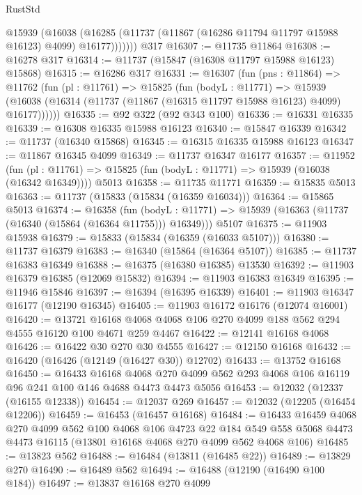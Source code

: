 \begin{lexlean}{RustStd}
\begin{coremodule}
          @15939
            (@16038
              (@16285 (@11737 (@11867 (@16286 @11794 @11797 @15988 @16123) @4099) @16177)))))))
    @317
@16307 := @11735 @11864
@16308 := @16278 @317
@16314 := @11737 (@15847 (@16308 @11797 @15988 @16123) @15868)
@16315 := @16286 @317
@16331 := @16307
    (fun (pns : @11864) =>
    @11762
      (fun (pl : @11761) =>
      @15825
        (fun (bodyL : @11771) =>
        @15939 (@16038 (@16314 (@11737 (@11867 (@16315 @11797 @15988 @16123) @4099) @16177))))))
@16335 := @92 @322 (@92 @343 @100)
@16336 := @16331 @16335
@16339 := @16308 @16335 @15988 @16123
@16340 := @15847 @16339
@16342 := @11737 (@16340 @15868)
@16345 := @16315 @16335 @15988 @16123
@16347 := @11867 @16345 @4099
@16349 := @11737 @16347 @16177
@16357 := @11952
    (fun (pl : @11761) => @15825 (fun (bodyL : @11771) => @15939 (@16038 (@16342 @16349))))
    @5013
@16358 := @11735 @11771
@16359 := @15835 @5013
@16363 := @11737 (@15833 (@15834 (@16359 @16034)))
@16364 := @15865 @5013
@16374 := @16358
    (fun (bodyL : @11771) => @15939 (@16363 (@11737 (@16340 (@15864 (@16364 @11755))) @16349)))
    @5107
@16375 := @11903 @15938
@16379 := @15833 (@15834 (@16359 (@16033 @5107)))
@16380 := @11737 @16379
@16383 := @16340 (@15864 (@16364 @5107))
@16385 := @11737 @16383 @16349
@16388 := @16375 (@16380 @16385) @13530
@16392 := @11903 @16379 @16385 (@12069 @15832)
@16394 := @11903 @16383 @16349
@16395 := @11946 @15846
@16397 := @16394 (@16395 @16339)
@16401 := @11903 @16347 @16177 (@12190 @16345)
@16405 := @11903 @16172 @16176 (@12074 @16001)
@16420 := @13721
    @16168
    @4068
    @4068
    @106
    @270
    @4099
    @188
    @562
    @294
    @4555
    @16120
    @100
    @4671
    @259
    @4467
@16422 := @12141 @16168 @4068
@16426 := @16422 @30 @270 @30 @4555
@16427 := @12150 @16168
@16432 := @16420 (@16426 (@12149 (@16427 @30)) @12702)
@16433 := @13752 @16168
@16450 := @16433
    @16168
    @4068
    @270
    @4099
    @562
    @293
    @4068
    @106
    @16119
    @96
    @241
    @100
    @146
    @4688
    @4473
    @4473
    @5056
@16453 := @12032 (@12337 (@16155 @12338))
@16454 := @12037 @269
@16457 := @12032 (@12205 (@16454 @12206))
@16459 := @16453 (@16457 @16168)
@16484 := @16433
    @16459
    @4068
    @270
    @4099
    @562
    @100
    @4068
    @106
    @4723
    @22
    @184
    @549
    @558
    @5068
    @4473
    @4473
    @16115
    (@13801 @16168 @4068 @270 @4099 @562 @4068 @106)
@16485 := @13823 @562
@16488 := @16484 (@13811 (@16485 @22))
@16489 := @13829 @270
@16490 := @16489 @562
@16494 := @16488 (@12190 (@16490 @100 @184))
@16497 := @13837 @16168 @270 @4099

\end{coremodule}
\end{lexlean}
